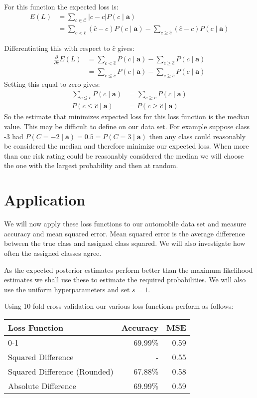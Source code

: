 For this function the expected loss is:
\begin{align}
	E(L) & = \sum_{c \in \mathcal{C}} |c - \hat{c}|P(c \mid \mathbf{a}) \\
	     & = \sum_{c < \hat{c}} (\hat{c} - c)P(c \mid \mathbf{a}) - \sum_{c \geq \hat{c}} (\hat{c} - c)P(c \mid \mathbf{a})
\end{align}

Differentiating this with respect to $\hat{c}$ gives:
\begin{align}
	\frac{\partial}{\partial \hat{c}} E(L) & = \sum_{c < \hat{c}} P(c \mid \mathbf{a}) - \sum_{c \geq \hat{c}} P(c \mid \mathbf{a}) \\
	& = \sum_{c \leq \hat{c}} P(c \mid \mathbf{a}) - \sum_{c \geq \hat{c}} P(c \mid \mathbf{a})
\end{align}
Setting this equal to zero gives:
\begin{align}
	\sum_{c \leq \hat{c}} P(c \mid \mathbf{a}) & = \sum_{c \geq \hat{c}} P(c \mid \mathbf{a}) \\
	P(c \leq \hat{c} \mid \mathbf{a}) & = P(c \geq \hat{c} \mid \mathbf{a})
\end{align}
So the estimate that minimizes expected loss for this loss function is the median value.
This may be difficult to define on our data set.
For example suppose class -3 had $P(C = -2 \mid \mathbf{a}) = 0.5 = P(C=3 \mid \mathbf{a})$ then any class could reasonably be considered the median and therefore minimize our expected loss.
When more than one risk rating could be reasonably considered the median we will choose the one with the largest probability and then at random.

\section{Application}
We will now apply these loss functions to our automobile data set and measure accuracy and mean squared error.
Mean squared error is the average difference between the true class and assigned class squared.
We will also investigate how often the assigned classes agree.

As the expected posterior estimates perform better than the maximum likelihood estimates we shall use these to estimate the required probabilities.
We will also use the uniform hyperparameters and set $s=1$.

Using 10-fold cross validation our various loss functions perform as follows:

\begin{center}
	\begin{tabular}{l r r}
		\hline
		Loss Function                & Accuracy & MSE  \\
		\hline
		0-1                          & 69.99\%  & 0.59 \\
		Squared Difference           & -        & 0.55 \\
		Squared Difference (Rounded) & 67.88\%  & 0.58 \\
		Absolute Difference          & 69.99\%  & 0.59 \\
		\hline
	\end{tabular}
\end{center}

